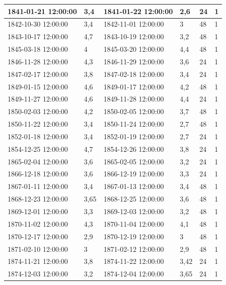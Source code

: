 \documentclass[11pt]{article}
\begin{document}
\begin{longtable}{|l|p{2.3cm}|l|p{2.3cm}|l|l|}
        1841-01-21 12:00:00 & 3,4 & 1841-01-22 12:00:00 & 2,6 & 24 & 1 \\ \hline
        1842-10-30 12:00:00 & 3,4 & 1842-11-01 12:00:00 & 3 & 48 & 1 \\ \hline
        1843-10-17 12:00:00 & 4,7 & 1843-10-19 12:00:00 & 3,2 & 48 & 1 \\ \hline
        1845-03-18 12:00:00 & 4 & 1845-03-20 12:00:00 & 4,4 & 48 & 1 \\ \hline
        1846-11-28 12:00:00 & 4,3 & 1846-11-29 12:00:00 & 3,6 & 24 & 1 \\ \hline
        1847-02-17 12:00:00 & 3,8 & 1847-02-18 12:00:00 & 3,4 & 24 & 1 \\ \hline
        1849-01-15 12:00:00 & 4,6 & 1849-01-17 12:00:00 & 4,2 & 48 & 1 \\ \hline
        1849-11-27 12:00:00 & 4,6 & 1849-11-28 12:00:00 & 4,4 & 24 & 1 \\ \hline
        1850-02-03 12:00:00 & 4,2 & 1850-02-05 12:00:00 & 3,7 & 48 & 1 \\ \hline
        1850-11-22 12:00:00 & 3,4 & 1850-11-24 12:00:00 & 2,7 & 48 & 1 \\ \hline
        1852-01-18 12:00:00 & 3,4 & 1852-01-19 12:00:00 & 2,7 & 24 & 1 \\ \hline
        1854-12-25 12:00:00 & 4,7 & 1854-12-26 12:00:00 & 3,8 & 24 & 1 \\ \hline
        1865-02-04 12:00:00 & 3,6 & 1865-02-05 12:00:00 & 3,2 & 24 & 1 \\ \hline
        1866-12-18 12:00:00 & 3,6 & 1866-12-19 12:00:00 & 3,3 & 24 & 1 \\ \hline
        1867-01-11 12:00:00 & 3,4 & 1867-01-13 12:00:00 & 3,4 & 48 & 1 \\ \hline
        1868-12-23 12:00:00 & 3,65 & 1868-12-25 12:00:00 & 3,6 & 48 & 1 \\ \hline
        1869-12-01 12:00:00 & 3,3 & 1869-12-03 12:00:00 & 3,2 & 48 & 1 \\ \hline
        1870-11-02 12:00:00 & 4,3 & 1870-11-04 12:00:00 & 4,1 & 48 & 1 \\ \hline
        1870-12-17 12:00:00 & 2,9 & 1870-12-19 12:00:00 & 3 & 48 & 1 \\ \hline
        1871-02-10 12:00:00 & 3 & 1871-02-12 12:00:00 & 2,9 & 48 & 1 \\ \hline
        1874-11-21 12:00:00 & 3,8 & 1874-11-22 12:00:00 & 3,42 & 24 & 1 \\ \hline
        1874-12-03 12:00:00 & 3,2 & 1874-12-04 12:00:00 & 3,65 & 24 & 1 \\ \hline

\end{longtable}
\end{document}
